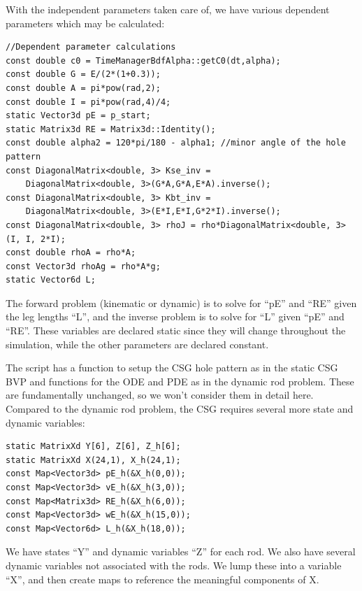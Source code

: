 \documentclass[12pt]{article}
\begin{document}
\newpage \noindent
With the independent parameters taken care of, we have various dependent parameters which may be calculated:
\begin{lstlisting}
//Dependent parameter calculations
const double c0 = TimeManagerBdfAlpha::getC0(dt,alpha);
const double G = E/(2*(1+0.3));
const double A = pi*pow(rad,2);
const double I = pi*pow(rad,4)/4;
static Vector3d pE = p_start;
static Matrix3d RE = Matrix3d::Identity();
const double alpha2 = 120*pi/180 - alpha1; //minor angle of the hole pattern
const DiagonalMatrix<double, 3> Kse_inv =
    DiagonalMatrix<double, 3>(G*A,G*A,E*A).inverse();
const DiagonalMatrix<double, 3> Kbt_inv =
    DiagonalMatrix<double, 3>(E*I,E*I,G*2*I).inverse();
const DiagonalMatrix<double, 3> rhoJ = rho*DiagonalMatrix<double, 3>(I, I, 2*I);
const double rhoA = rho*A;
const Vector3d rhoAg = rho*A*g;
static Vector6d L;
\end{lstlisting}
The forward problem (kinematic or dynamic) is to solve for ``pE'' and ``RE'' given the leg lengths ``L'', and the inverse problem is to solve for ``L'' given ``pE'' and ``RE''. These variables are declared static since they will change throughout the simulation, while the other parameters are declared constant.

The script has a function to setup the CSG hole pattern as in the static CSG BVP and functions for the ODE and PDE as in the dynamic rod problem. These are fundamentally unchanged, so we won't consider them in detail here. Compared to the dynamic rod problem, the CSG requires several more state and dynamic variables:
\begin{lstlisting}
static MatrixXd Y[6], Z[6], Z_h[6];
static MatrixXd X(24,1), X_h(24,1);
const Map<Vector3d> pE_h(&X_h(0,0));
const Map<Vector3d> vE_h(&X_h(3,0));
const Map<Matrix3d> RE_h(&X_h(6,0));
const Map<Vector3d> wE_h(&X_h(15,0));
const Map<Vector6d> L_h(&X_h(18,0));
\end{lstlisting}
We have states ``Y'' and dynamic variables ``Z'' for each rod. We also have several dynamic variables not associated with the rods. We lump these into a variable ``X'', and then create maps to reference the meaningful components of X.
\end{document}
